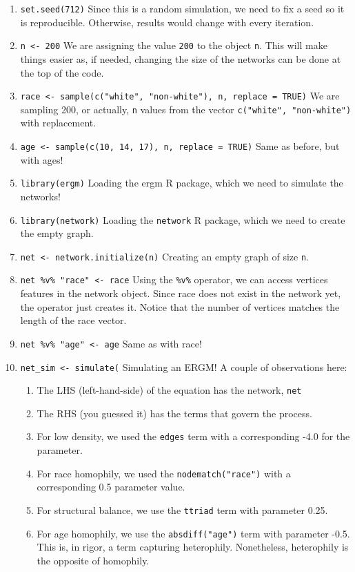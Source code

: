 \documentclass[
]{book}
\begin{document}
\begin{enumerate}
\def\labelenumi{\arabic{enumi}.}
\item
  \texttt{set.seed(712)} Since this is a random simulation, we need to fix a seed so it is reproducible. Otherwise, results would change with every iteration.
\item
  \texttt{n\ \textless{}-\ 200} We are assigning the value \texttt{200} to the object \texttt{n}. This will make things easier as, if needed, changing the size of the networks can be done at the top of the code.
\item
  \texttt{race\ \textless{}-\ sample(c("white",\ "non-white"),\ n,\ replace\ =\ TRUE)} We are sampling 200, or actually, \texttt{n} values from the vector \texttt{c("white",\ "non-white")} with replacement.
\item
  \texttt{age\ \textless{}-\ sample(c(10,\ 14,\ 17),\ n,\ replace\ =\ TRUE)} Same as before, but with ages!
\item
  \texttt{library(ergm)} Loading the ergm R package, which we need to simulate the networks!
\item
  \texttt{library(network)} Loading the \texttt{network} R package, which we need to create the empty graph.
\item
  \texttt{net\ \textless{}-\ network.initialize(n)} Creating an empty graph of size \texttt{n}.
\item
  \texttt{net\ \%v\%\ "race"\ \textless{}-\ race} Using the \texttt{\%v\%} operator, we can access vertices features in the network object. Since race does not exist in the network yet, the operator just creates it. Notice that the number of vertices matches the length of the race vector.
\item
  \texttt{net\ \%v\%\ "age"\ \textless{}-\ age} Same as with race!
\item
  \texttt{net\_sim\ \textless{}-\ simulate(} Simulating an ERGM! A couple of observations here:

  \begin{enumerate}
  \def\labelenumii{\alph{enumii}.}
  \item
    The LHS (left-hand-side) of the equation has the network, \texttt{net}
  \item
    The RHS (you guessed it) has the terms that govern the process.
  \item
    For low density, we used the \texttt{edges} term with a corresponding
    -4.0 for the parameter.
  \item
    For race homophily, we used the \texttt{nodematch("race")} with a
    corresponding 0.5 parameter value.
  \item
    For structural balance, we use the \texttt{ttriad} term with parameter
    0.25.
  \item
    For age homophily, we use the \texttt{absdiff("age")} term with parameter
    -0.5. This is, in rigor, a term capturing heterophily. Nonetheless,
    heterophily is the opposite of homophily.
  \end{enumerate}
\end{enumerate}
\end{document}
